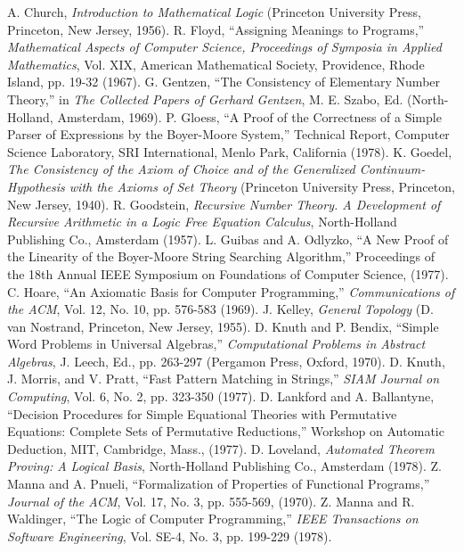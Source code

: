 \documentclass[10pt]{book}
\begin{document}
\begin{thebibliography}{99}
 A. Church, \emph{Introduction to Mathematical Logic} (Princeton University Press, Princeton, New Jersey, 1956).
 R. Floyd, ``Assigning Meanings to Programs,'' \emph{Mathematical Aspects of Computer Science, Proceedings of Symposia in Applied Mathematics}, Vol. XIX, American Mathematical Society, Providence, Rhode Island, pp. 19-32 (1967).
 G. Gentzen, ``The Consistency of Elementary Number Theory,'' in \emph{The Collected Papers of Gerhard Gentzen}, M. E. Szabo, Ed. (North-Holland, Amsterdam, 1969).
 P. Gloess, ``A Proof of the Correctness of a Simple Parser of Expressions by the Boyer-Moore System,'' Technical Report, Computer Science Laboratory, SRI International, Menlo Park, California (1978).
 K. Goedel, \emph{The Consistency of the Axiom of Choice and of the Generalized Continuum-Hypothesis with the Axioms of Set Theory} (Princeton University Press, Princeton, New Jersey, 1940).
 R. Goodstein, \emph{Recursive Number Theory.  A Development of Recursive Arithmetic in a Logic Free Equation Calculus}, North-Holland Publishing Co., Amsterdam (1957).
 L. Guibas and A. Odlyzko, ``A New Proof of the Linearity of the Boyer-Moore String Searching Algorithm,'' Proceedings of the 18th Annual IEEE Symposium on Foundations of Computer Science, (1977).
 C. Hoare, ``An Axiomatic Basis for Computer Programming,'' \emph{Communications of the ACM}, Vol. 12, No. 10, pp. 576-583 (1969).
 J. Kelley, \emph{General Topology} (D. van Nostrand, Princeton, New Jersey, 1955).
 D. Knuth and P. Bendix, ``Simple Word Problems in Universal Algebras,'' \emph{Computational Problems in Abstract Algebras}, J. Leech, Ed., pp. 263-297  (Pergamon Press, Oxford, 1970).
 D. Knuth, J. Morris, and V. Pratt, ``Fast Pattern Matching in Strings,'' \emph{SIAM Journal on Computing}, Vol. 6, No. 2, pp. 323-350 (1977).
 D. Lankford and A. Ballantyne, ``Decision Procedures for Simple Equational Theories with Permutative Equations:  Complete Sets of Permutative Reductions,'' Workshop on Automatic Deduction, MIT, Cambridge, Mass., (1977).
 D. Loveland, \emph{Automated Theorem Proving: A Logical Basis}, North-Holland Publishing Co., Amsterdam (1978).
 Z. Manna and A. Pnueli, ``Formalization of Properties of Functional Programs,'' \emph{Journal of the ACM}, Vol. 17, No. 3, pp. 555-569, (1970).
 Z. Manna and R. Waldinger, ``The Logic of Computer Programming,'' \emph{IEEE Transactions on Software Engineering}, Vol. SE-4, No. 3, pp. 199-229 (1978).

\end{thebibliography}
\end{document}
